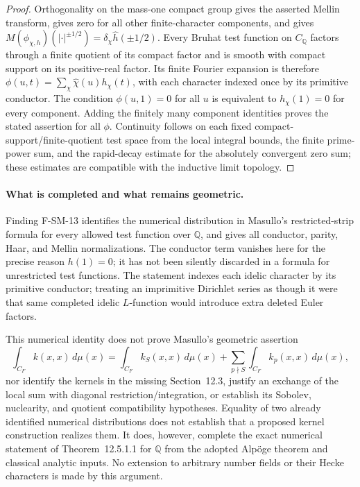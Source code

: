 \begin{proof}
Orthogonality on the mass-one compact group gives the asserted Mellin
transform, gives zero for all other finite-character components, and gives
$M(\phi_{\chi,h})(|\cdot|^{\pm1/2})=
\delta_\chi\widehat h(\pm1/2)$.  Every Bruhat test function on
$C_{\mathbb Q}$ factors through a finite quotient of its compact factor
and is smooth with compact support on its positive-real factor.  Its
finite Fourier expansion is therefore
$\phi(u,t)=\sum_\chi\widehat\chi(u)h_\chi(t)$, with each character
indexed once by its primitive conductor.  The condition
$\phi(u,1)=0$ for all $u$ is equivalent to $h_\chi(1)=0$ for every
component.  Adding the finitely many component identities proves the
stated assertion for all $\phi$.  Continuity follows on each fixed
compact-support/finite-quotient test space from the local integral bounds,
the finite prime-power sum, and the rapid-decay estimate for the absolutely
convergent zero sum; these estimates are compatible with the inductive
limit topology.
\end{proof}

\paragraph{What is completed and what remains geometric.}
Finding F-SM-13 identifies the numerical distribution in Masullo's
restricted-strip formula for every allowed test function over
$\mathbb Q$, and gives all conductor, parity, Haar, and Mellin
normalizations.  The conductor term vanishes here for the precise reason
$h(1)=0$; it has not been silently discarded in a formula for unrestricted
test functions.  The statement indexes each idelic character by its
primitive conductor; treating an imprimitive Dirichlet series as though it
were that same completed idelic $L$-function would introduce extra deleted
Euler factors.

This numerical identity does not prove Masullo's geometric assertion
\[
 \int_{C_F}k(x,x)\,d\mu(x)
 =\int_{C_F}k_S(x,x)\,d\mu(x)
   +\sum_{p\nmid S}\int_{C_F}k_p(x,x)\,d\mu(x),
\]
nor identify the kernels in the missing Section~12.3, justify an exchange
of the local sum with diagonal restriction/integration, or establish its
Sobolev, nuclearity, and quotient compatibility hypotheses.  Equality of
two already identified numerical distributions does not establish that
a proposed kernel construction realizes them.  It does, however, complete
the exact numerical statement of Theorem~12.5.1.1 for $\mathbb Q$ from
the adopted Alp\"oge theorem and classical analytic inputs.  No extension
to arbitrary number fields or their Hecke characters is made by this
argument.
